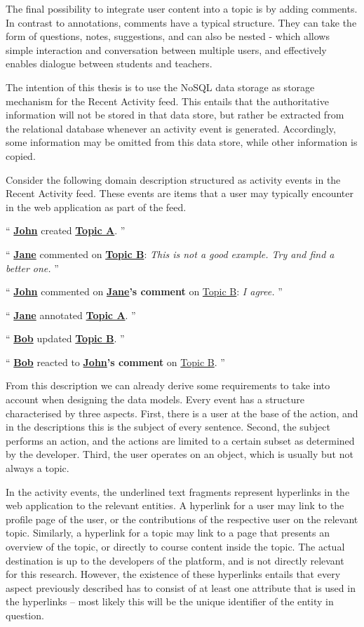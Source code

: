The final possibility to integrate user content into a topic is by adding comments.
In contrast to annotations, comments have a typical structure.
They can take the form of questions, notes, suggestions, and can also be nested - which allows simple interaction and conversation between multiple users, and effectively enables dialogue between students and teachers.

The intention of this thesis is to use the NoSQL data storage as storage mechanism for the Recent Activity feed.
This entails that the authoritative information will not be stored in that data store, but rather be extracted from the relational database whenever an activity event is generated.
Accordingly, some information may be omitted from this data store, while other information is copied.

Consider the following domain description structured as activity events in the Recent Activity feed.
These events are items that a user may typically encounter in the web application as part of the feed.

``
\textbf{\underline{John}} created \textbf{\underline{Topic A}}.
''

``
\textbf{\underline{Jane}} commented on \textbf{\underline{Topic B}}:
\textit{This is not a good example. Try and find a better one.}
''

``
\textbf{\underline{John}} commented on \textbf{\underline{Jane}'s comment} on \underline{Topic B}:
\textit{I agree.}
''

``
\textbf{\underline{Jane}} annotated \textbf{\underline{Topic A}}.
''

``
\textbf{\underline{Bob}} updated \textbf{\underline{Topic B}}.
''

``
\textbf{\underline{Bob}} reacted to \textbf{\underline{John}'s comment} on \underline{Topic B}.
''

From this description we can already derive some requirements to take into account when designing the data models.
Every event has a structure characterised by three aspects.
First, there is a user at the base of the action, and in the descriptions this is the subject of every sentence.
Second, the subject performs an action, and the actions are limited to a certain subset as determined by the developer.
Third, the user operates on an object, which is usually but not always a topic.

In the activity events, the underlined text fragments represent hyperlinks in the web application to the relevant entities.
A hyperlink for a user may link to the profile page of the user, or the contributions of the respective user on the relevant topic.
Similarly, a hyperlink for a topic may link to a page that presents an overview of the topic, or directly to course content inside the topic.
The actual destination is up to the developers of the platform, and is not directly relevant for this research.
However, the existence of these hyperlinks entails that every aspect previously described has to consist of at least one attribute that is used in the hyperlinks -- most likely this will be the unique identifier of the entity in question.\\

